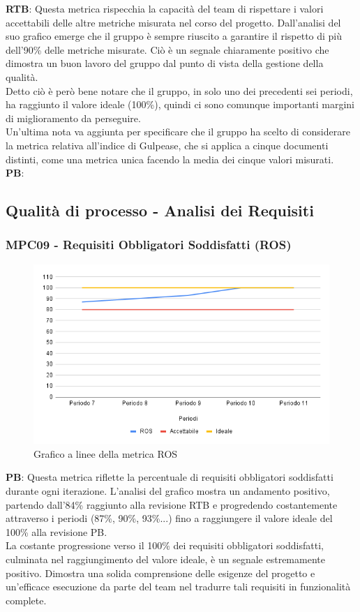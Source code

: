 \documentclass[10pt]{article}
\begin{document}
\begin{justify}
\textbf{RTB}: Questa metrica rispecchia la capacità del team di rispettare i valori accettabili delle altre metriche misurata nel corso del progetto. Dall'analisi del suo 
grafico emerge che il gruppo è sempre riuscito a garantire il rispetto di più dell'90\% delle metriche misurate. Ciò è un segnale chiaramente positivo che dimostra
un buon lavoro del gruppo dal punto di vista della gestione della qualità.\\
Detto ciò è però bene notare che il gruppo, in solo uno dei precedenti sei periodi, ha raggiunto il valore ideale (100\%), quindi ci sono comunque importanti margini
di miglioramento da perseguire.\\
Un'ultima nota va aggiunta per specificare che il gruppo ha scelto di considerare la metrica relativa all'indice di Gulpease, che si applica a cinque documenti distinti, come 
una metrica unica facendo la media dei cinque valori misurati.\\

\noindent
\textbf{PB}: 



\subsection{Qualità di processo - Analisi dei Requisiti}
\subsubsection{MPC09 - Requisiti Obbligatori Soddisfatti (ROS)}

\begin{figure}[H]
  \centering
  \includegraphics[width=0.9\linewidth]{ROS.png}
  \caption{Grafico a linee della metrica ROS}
\end{figure}

\textbf{PB}: Questa metrica riflette la percentuale di requisiti obbligatori soddisfatti durante ogni iterazione. L'analisi del grafico mostra un andamento positivo, partendo dall'84\% raggiunto alla revisione RTB e progredendo costantemente attraverso i periodi (87\%, 90\%, 93\%...) fino a raggiungere il valore ideale del 100\% alla revisione PB.\\
La costante progressione verso il 100\% dei requisiti obbligatori soddisfatti, culminata nel raggiungimento del valore ideale, è un segnale estremamente positivo. Dimostra una solida comprensione delle esigenze del progetto e un'efficace esecuzione da parte del team nel tradurre tali requisiti in funzionalità complete.



\end{justify}
\end{document}
